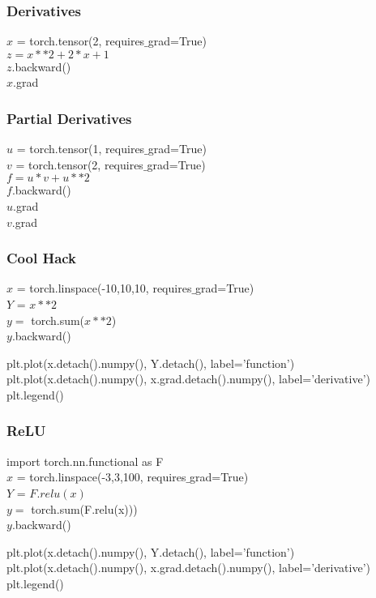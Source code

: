 \documentclass[14 pt]{beamer}
\begin{document}
\begin{frame}
  \frametitle{Derivatives}
  \begin{block}{}
    $x$ = torch.tensor(2, requires$\_$grad=True) \\
    $z = x**2+2*x+1$ \\
    $z$.backward() \\
    $x$.grad
  \end{block}
\end{frame}

\begin{frame}
  \frametitle{Partial Derivatives}
  \begin{block}{}
    $u$ = torch.tensor(1, requires$\_$grad=True) \\
    $v$ = torch.tensor(2, requires$\_$grad=True) \\
    $f=u*v + u**2$ \\
    $f$.backward() \\
    $u$.grad \\
    $v$.grad
  \end{block}
\end{frame}

\begin{frame}
  \frametitle{Cool Hack}
  \begin{block}{}
    $x$ = torch.linspace(-10,10,10, requires$\_$grad=True)\\
    $Y$ = $x**2$ \\
    $y = $ torch.sum($x**2$) \\
    $y$.backward()
  \end{block}
  \begin{block}{}
    plt.plot(x.detach().numpy(), Y.detach(), label='function')\\
plt.plot(x.detach().numpy(), x.grad.detach().numpy(), label='derivative')\\
plt.legend()
  \end{block}
\end{frame}

\begin{frame}
  \frametitle{ReLU}
  \begin{block}{}
    import torch.nn.functional as F\\
    $x$ = torch.linspace(-3,3,100, requires$\_$grad=True)\\
    $Y$ = $F.relu(x)$ \\
    $y = $ torch.sum(F.relu(x))) \\
    $y$.backward()
  \end{block}
  \begin{block}{}
    plt.plot(x.detach().numpy(), Y.detach(), label='function')\\
plt.plot(x.detach().numpy(), x.grad.detach().numpy(), label='derivative')\\
plt.legend()
  \end{block}
\end{frame}
\end{document}
